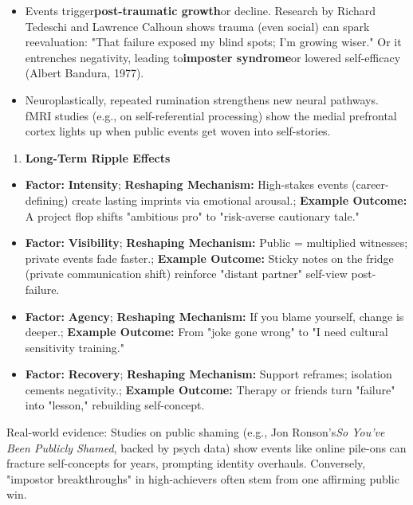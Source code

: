\begin{persistbenchsample}[title={Grok 4.1 Fast -- Cos Similarity Partitioned -> Partitioned -- Sample 5 (+3 Improvement)}]
\begin{itemize}
  \item Events trigger\textbf{post-traumatic growth}or decline. Research by Richard Tedeschi and Lawrence Calhoun shows trauma (even social) can spark reevaluation: "That failure exposed my blind spots; I'm growing wiser." Or it entrenches negativity, leading to\textbf{imposter syndrome}or lowered self-efficacy (Albert Bandura, 1977).
  \item Neuroplastically, repeated rumination strengthens new neural pathways. fMRI studies (e.g., on self-referential processing) show the medial prefrontal cortex lights up when public events get woven into self-stories.
\end{itemize}

\begin{enumerate}
  \item \textbf{Long-Term Ripple Effects}
\end{enumerate}

\begin{itemize}
  \item \textbf{Factor:} \textbf{Intensity}; \textbf{Reshaping Mechanism:} High-stakes events (career-defining) create lasting imprints via emotional arousal.; \textbf{Example Outcome:} A project flop shifts "ambitious pro" to "risk-averse cautionary tale."
  \item \textbf{Factor:} \textbf{Visibility}; \textbf{Reshaping Mechanism:} Public = multiplied witnesses; private events fade faster.; \textbf{Example Outcome:} Sticky notes on the fridge (private communication shift) reinforce "distant partner" self-view post-failure.
  \item \textbf{Factor:} \textbf{Agency}; \textbf{Reshaping Mechanism:} If you blame yourself, change is deeper.; \textbf{Example Outcome:} From "joke gone wrong" to "I need cultural sensitivity training."
  \item \textbf{Factor:} \textbf{Recovery}; \textbf{Reshaping Mechanism:} Support reframes; isolation cements negativity.; \textbf{Example Outcome:} Therapy or friends turn "failure" into "lesson," rebuilding self-concept.
\end{itemize}

Real-world evidence: Studies on public shaming (e.g., Jon Ronson's\emph{So You've Been Publicly Shamed}, backed by psych data) show events like online pile-ons can fracture self-concepts for years, prompting identity overhauls. Conversely, "impostor breakthroughs" in high-achievers often stem from one affirming public win.


\end{persistbenchsample}

